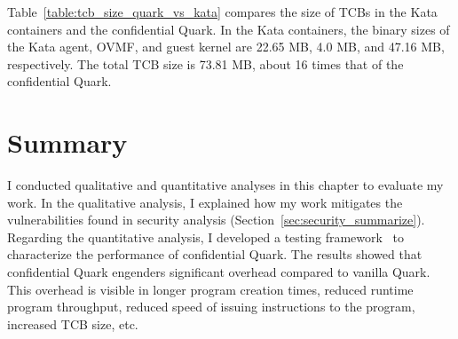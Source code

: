 Table~\ref{table:tcb_size_quark_vs_kata} compares the size of \acrshort{TCB}s in the Kata containers and the confidential Quark. In the Kata containers, the binary sizes of the Kata agent, OVMF, and guest kernel are 22.65 MB, 4.0 MB, and 47.16 MB, respectively. The total \acrshort{TCB} size is 73.81 MB, about 16 times that of the confidential 
Quark.

\section{Summary}
I conducted qualitative and quantitative analyses in this chapter to evaluate my work. In the qualitative analysis, I explained how my work mitigates the vulnerabilities found in security analysis (Section~\ref{sec:security_summarize}). 
Regarding the quantitative analysis, I developed a testing framework~\cite*{benchamark_framework} to characterize the performance of confidential Quark. The results showed that confidential Quark engenders significant overhead compared to vanilla Quark. 
This overhead is visible in longer program creation times, reduced runtime program throughput, reduced speed of issuing instructions to the program, increased \acrshort{TCB} size, etc.









\cleardoublepage

